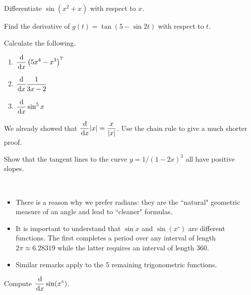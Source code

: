 \newpage

\begin{example}
Differentiate $\sin(x^2+x)$ with respect to $x$.
\end{example}

\vfill

\begin{example}
Find the derivative of $g(t) = \tan(5-\sin 2t)$ with respect to $t$.
\end{example}

\vfill\vfill
\newpage

\begin{example}
Calculate the following.
\begin{enumerate}[label=(\alph*)]
\item $\displaystyle\frac{\mkern 2mu \mathrm{d}}{\mkern 2mu \mathrm{d} x}\left(5x^4-x^3\right)^7$
\vfill
\item $\displaystyle\frac{\mkern 2mu \mathrm{d}}{\mkern 2mu \mathrm{d} x}\frac{1}{3x-2}$
\vfill 
\item $\displaystyle\frac{\mkern 2mu \mathrm{d}}{\mkern 2mu \mathrm{d} x}\sin^5 x$
\vfill 
\end{enumerate}
\end{example}

\newpage

\begin{example}
We already showed that $\displaystyle\frac{\mkern 2mu \mathrm{d}}{\mkern 2mu \mathrm{d} x}|x| = \frac{x}{|x|}$.
Use the chain rule to give a much shorter proof.
\end{example}
\vfill

\begin{example}
Show that the tangent lines to the curve $y= 1/(1-2x)^3$ all have positive slopes.
\end{example}
\vfill

\newpage

\begin{remark}\,
\begin{itemize}
\item There is a reason why we prefer radians: they are the ``natural" geometric measure of an angle and lead to ``cleaner" formulas.
\item It is important to understand that $\sin x$ and $\sin(x^\circ)$ are different functions.  The first completes a period over any interval of length $2\pi\approx 6.28319$ while the latter requires an interval of length $360$.
\item Similar remarks apply to the 5 remaining trigonometric functions.
\end{itemize}
\end{remark}

\begin{example}
Compute $\displaystyle\frac{\mkern 2mu \mathrm{d}}{\mkern 2mu \mathrm{d} x}\sin(x^\circ)$.
\end{example}
